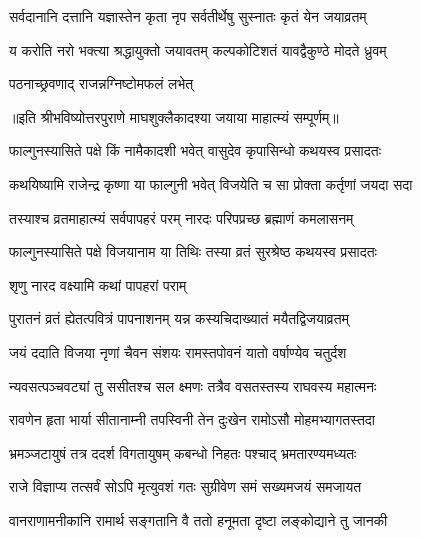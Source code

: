 \twolineshloka
{सर्वदानानि दत्तानि यज्ञास्तेन कृता नृप}
{सर्वतीर्थेषु सुस्नातः कृतं येन जयाव्रतम्} %

\twolineshloka
{य करोति नरो भक्त्या श्रद्धायुक्तो जयावतम्}
{कल्पकोटिशतं यावद्वैकुण्ठे मोदते ध्रुवम्} %

\onelineshloka
{पठनाच्छ्रवणाद् राजन्नग्निष्टोमफलं लभेत्} %

॥इति श्रीभविष्योत्तरपुराणे माघशुक्लैकादश्या जयाया माहात्म्यं सम्पूर्णम्॥


\hyperref[sec:ekadashi_mahatmyam_vrata_raja]{\closesub}
\clearpage

\label{sec:vrata-raja-phalguna-krishna-vijaya}


\twolineshloka
{फाल्गुनस्यासिते पक्षे किं नामैकादशी भवेत्}
{वासुदेव कृपासिन्धो कथयस्व प्रसादतः} %


\twolineshloka
{कथयिष्यामि राजेन्द्र कृष्णा या फाल्गुनी भवेत्}
{विजयेति च सा प्रोक्ता कर्तृणां जयदा सदा} %

\twolineshloka
{तस्याश्च व्रतमाहात्म्यं सर्वपापहरं परम्}
{नारदः परिपप्रच्छ ब्रह्माणं कमलासनम्} %

\twolineshloka
{फाल्गुनस्यासिते पक्षे विजयानाम या तिथिः}
{तस्या व्रतं सुरश्रेष्ठ कथयस्व प्रसादतः} %



\onelineshloka
{शृणु नारद वक्ष्यामि कथां पापहरां पराम्} %

\twolineshloka
{पुरातनं व्रतं ह्येतत्पवित्रं पापनाशनम्}
{यन्न कस्यचिदाख्यातं मयैतद्विजयाव्रतम्} %

\twolineshloka
{जयं ददाति विजया नृणां चैवन संशयः}
{रामस्तपोवनं यातो वर्षाण्येव चतुर्दश} %

\twolineshloka
{न्यवसत्पञ्चवट्यां तु ससीतश्च सल क्ष्मणः}
{तत्रैव वसतस्तस्य राघवस्य महात्मनः} %

\twolineshloka
{रावणेन हृता भार्या सीतानाम्नी तपस्विनी}
{तेन दुःखेन रामोऽसौ मोहमभ्यागतस्तदा} %

\twolineshloka
{भ्रमञ्जटायुषं तत्र ददर्श विगतायुषम्}
{कबन्धो निहतः पश्चाद् भ्रमतारण्यमध्यतः} %

\twolineshloka
{राजे विज्ञाप्य तत्सर्वं सोऽपि मृत्युवशं गतः}
{सुग्रीवेण समं सख्यमजयं समजायत} %

\twolineshloka
{वानराणामनीकानि रामार्थ सङ्गतानि वै}
{ततो हनूमता दृष्टा लङ्कोद्याने तु जानकी} %

